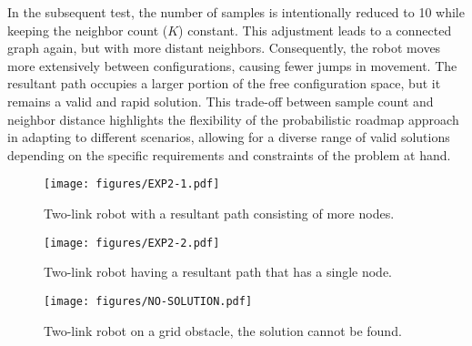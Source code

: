 \documentclass{IEEEtaes}
\begin{document}
In the subsequent test, the number of samples is intentionally reduced to 10 while keeping the neighbor count ($K$) constant. This adjustment leads to a connected graph again, but with more distant neighbors. Consequently, the robot moves more extensively between configurations, causing fewer jumps in movement. The resultant path occupies a larger portion of the free configuration space, but it remains a valid and rapid solution. This trade-off between sample count and neighbor distance highlights the flexibility of the probabilistic roadmap approach in adapting to different scenarios, allowing for a diverse range of valid solutions depending on the specific requirements and constraints of the problem at hand.
\begin{figure*}[t]
    \begin{center}
        \texttt{[image: figures/EXP2-1.pdf]}
     \end{center}
     \vspace{-1em}
     \caption{Two-link robot with a resultant path consisting of more nodes.}
     \label{two-link-1}
     \vspace{-1em}
\end{figure*}

\begin{figure*}[t]
    \begin{center}
        \texttt{[image: figures/EXP2-2.pdf]}
     \end{center}
     \vspace{-1em}
     \caption{Two-link robot having a resultant path that has a single node.}
     \label{two-link-2}
     \vspace{-1em}
\end{figure*}


\begin{figure*}[b]
    \vspace{-1em}
    \begin{center}
        \texttt{[image: figures/NO-SOLUTION.pdf]}
     \end{center}
     \vspace{-1em}
     \caption{Two-link robot on a grid obstacle, the solution cannot be found.}
     \label{no-solution}
     \vspace{-1em}
\end{figure*}
\end{document}
